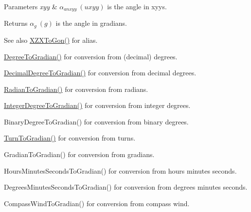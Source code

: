 \begin{DoxyParams}{Parameters}
{\em xyy} & $\alpha_{anxyy}\ (uxyy)$ is the angle in xyys. \\
\hline
\end{DoxyParams}
\begin{DoxyReturn}{Returns}
$\alpha_{g}\ (g)$ is the angle in gradians. 
\end{DoxyReturn}
\begin{DoxySeeAlso}{See also}
\mbox{\hyperlink{group___e_g_x_math-_angle_conversions-_x_z_x_ga5b73732dd6ff688b3aa07629fc9acb44}{X\+Z\+X\+To\+Gon()}} for alias. 

\mbox{\hyperlink{group___e_g_x_math-_angle_conversions-_degree_ga25bb5506b3f66fff7a1b85bf7bd795b3}{Degree\+To\+Gradian()}} for conversion from (decimal) degrees. 

\mbox{\hyperlink{group___e_g_x_math-_angle_conversions-_decimal_degree_ga3ac6f1ceb36a4938cdf3b55554734c99}{Decimal\+Degree\+To\+Gradian()}} for conversion from decimal degrees. 

\mbox{\hyperlink{group___e_g_x_math-_angle_conversions-_radian_ga3c1607eae50cbf0186c42485bb3878d5}{Radian\+To\+Gradian()}} for conversion from radians. 

\mbox{\hyperlink{group___e_g_x_math-_angle_conversions-_integer_degree_ga47127467ff7a8ef57f6be9ce496a97df}{Integer\+Degree\+To\+Gradian()}} for conversion from integer degrees. 

Binary\+Degree\+To\+Gradian() for conversion from binary degrees. 

\mbox{\hyperlink{group___e_g_x_math-_angle_conversions-_turn_gad6aa9bdde2cde17cec136b24ee017bba}{Turn\+To\+Gradian()}} for conversion from turns. 

Gradian\+To\+Gradian() for conversion from gradians. 

Hours\+Minutes\+Seconds\+To\+Gradian() for conversion from hours minutes seconds. 

Degrees\+Minutes\+Seconds\+To\+Gradian() for conversion from degrees minutes seconds. 

Compass\+Wind\+To\+Gradian() for conversion from compass wind. 
\end{DoxySeeAlso}
\mbox{\label{group___e_g_x_math-_angle_conversions-_x_z_x_ga3f52a8fe8ff0da0ebf9f05bb482b6a17}} 

